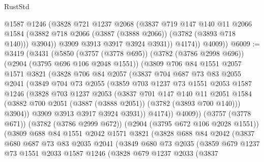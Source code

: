 \begin{lexlean}{RustStd}
\begin{coremodule}
                @1587
                @1246
                (@3828
                  @721
                  @1237
                  @2068
                  (@3837
                    @719
                    @147
                    @140
                    @11
                    @2066
                    @1584
                    (@3882 @718 @2066 (@3887 (@3888 @2066)) (@3782 (@3893 @718 @140)))
                    @3904))
                @3909
                @3913
                @3917
                @3924
                @3931))
            @4174))
        @4009))
@6009 := @3419
    (@3431
      (@5850
        (@3757 (@3778 @695))
        (@3782 (@3786 @2998 @696))
        (@2904 (@3795 @696 @106 @2048 @1551))
        (@3809
          @706
          @84
          @1551
          @2057
          @1571
          @3821
          (@3828
            @706
            @84
            @2057
            (@3837
              @704
              @687
              @73
              @83
              @2055
              @2041
              (@3849
                @704
                @73
                @2055
                (@3859
                  @703
                  @1237
                  @73
                  @1551
                  @2053
                  @1587
                  @1246
                  (@3828
                    @703
                    @1237
                    @2053
                    (@3837
                      @701
                      @147
                      @140
                      @11
                      @2051
                      @1584
                      (@3882 @700 @2051 (@3887 (@3888 @2051)) (@3782 (@3893 @700 @140)))
                      @3904))
                  @3909
                  @3913
                  @3917
                  @3924
                  @3931))
              @4174))
          @4009))
      (@3757 (@3778 @671))
      (@3782 (@3786 @2999 @672))
      (@2904 (@3795 @672 @106 @2028 @1551))
      (@3809
        @688
        @84
        @1551
        @2042
        @1571
        @3821
        (@3828
          @688
          @84
          @2042
          (@3837
            @680
            @687
            @73
            @83
            @2035
            @2041
            (@3849
              @680
              @73
              @2035
              (@3859
                @679
                @1237
                @73
                @1551
                @2033
                @1587
                @1246
                (@3828
                  @679
                  @1237
                  @2033
                  (@3837

\end{coremodule}
\end{lexlean}
